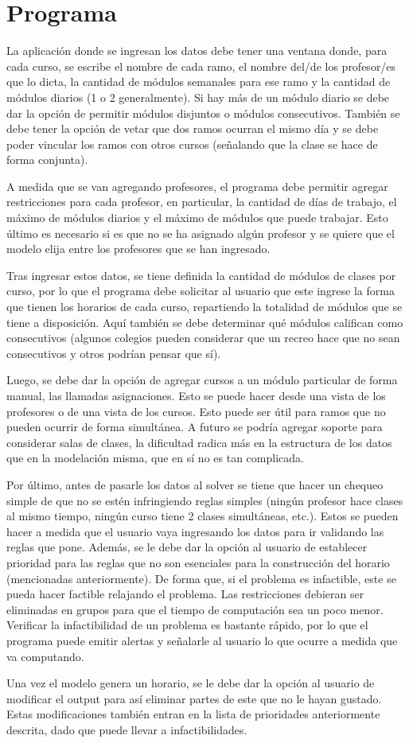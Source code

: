 \documentclass[letterpaper]{article}
\begin{document}
\section{Programa}

La aplicación donde se ingresan los datos debe tener una ventana donde, para cada curso, se escribe el nombre de cada ramo, el nombre del/de los profesor/es que lo dicta, la cantidad de módulos semanales para ese ramo y la cantidad de módulos diarios (1 o 2 generalmente). Si hay más de un módulo diario se debe dar la opción de permitir módulos disjuntos o módulos consecutivos. También se debe tener la opción de vetar que dos ramos ocurran el mismo día y se debe poder vincular los ramos con otros cursos (señalando que la clase se hace de forma conjunta).

A medida que se van agregando profesores, el programa debe permitir agregar restricciones para cada profesor, en particular, la cantidad de días de trabajo, el máximo de módulos diarios y el máximo de módulos que puede trabajar. Esto último es necesario si es que no se ha asignado algún profesor y se quiere que el modelo elija entre los profesores que se han ingresado. 

Tras ingresar estos datos, se tiene definida la cantidad de módulos de clases por curso, por lo que el programa debe solicitar al usuario que este ingrese la forma que tienen los horarios de cada curso, repartiendo la totalidad de módulos que se tiene a disposición. Aquí también se debe determinar qué módulos califican como consecutivos (algunos colegios pueden considerar que un recreo hace que no sean consecutivos y otros podrían pensar que sí). 

Luego, se debe dar la opción de agregar cursos a un módulo particular de forma manual, las llamadas asignaciones. Esto se puede hacer desde una vista de los profesores o de una vista de los cursos. Esto puede ser útil para ramos que no pueden ocurrir de forma simultánea. A futuro se podría agregar soporte para considerar salas de clases, la dificultad radica más en la estructura de los datos que en la modelación misma, que en sí no es tan complicada.

Por último, antes de pasarle los datos al solver se tiene que hacer un chequeo simple de que no se estén infringiendo reglas simples (ningún profesor hace clases al mismo tiempo, ningún curso tiene 2 clases simultáneas, etc.). Estos se pueden hacer a medida que el usuario vaya ingresando los datos para ir validando las reglas que pone. Además, se le debe dar la opción al usuario de establecer prioridad para las reglas que no son esenciales para la construcción del horario (mencionadas anteriormente). De forma que, si el problema es infactible, este se pueda hacer factible relajando el problema. Las restricciones debieran ser eliminadas en grupos para que el tiempo de computación sea un poco menor. Verificar la infactibilidad de un problema es bastante rápido, por lo que el programa puede emitir alertas y señalarle al usuario lo que ocurre a medida que va computando.

Una vez el modelo genera un horario, se le debe dar la opción al usuario de modificar el output para así eliminar partes de este que no le hayan gustado. Estas modificaciones también entran en la lista de prioridades anteriormente descrita, dado que puede llevar a infactibilidades. 
\end{document}
